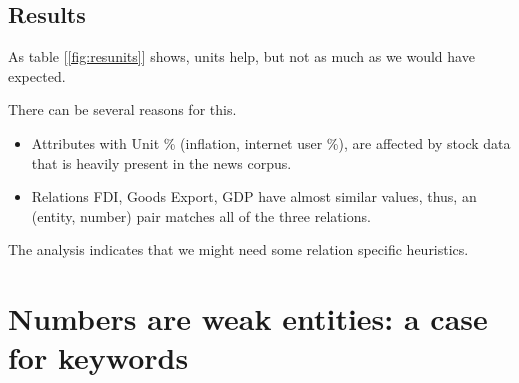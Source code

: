 \documentclass[a4paper,10pt]{article}
\begin{document}
\subsection{Results}
As table [\ref{fig:resunits}] shows, units help, but not as much as we would have expected.
\begin{center}
\begin{table}[H]
\caption{Unit Based}
\label{fig:resunits}
\end{table}
\end{center}

There can be several reasons for this.
 \begin{itemize}
  \item Attributes with Unit \% (inflation, internet user \%), are affected by stock data that is heavily present in the news corpus.
  \item Relations FDI, Goods Export, GDP have almost similar values, thus, an (entity, number) pair matches all of the three relations. 
  \end{itemize}
  
The analysis indicates that we might need some relation specific heuristics.
 

\section{Numbers are weak entities: a case for keywords}
\end{document}
